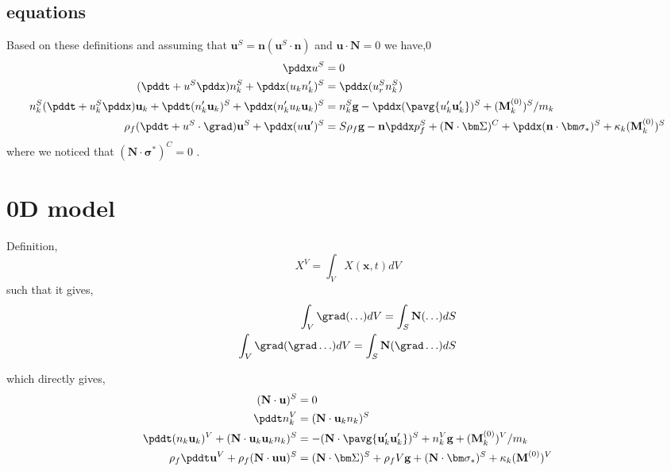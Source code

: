 \subsection{equations}
Based on these definitions and assuming that $\textbf{u}^S =\textbf{n}( \textbf{u}^S \cdot \textbf{n})$ and $\textbf{u}\cdot \textbf{N} = 0$ we have,0
\begin{align*}
    \pddx u^S &= 0\\
    (\pddt +  u^S \pddx) n_k^S 
    + \pddx (u_k n_k')^S
    &= 
    \pddx (u_r^S n_k^S)
    \\
    n_k^S (\pddt 
    + u_k^S \pddx)  \textbf{u}_k
    +\pddt (n_k' \textbf{u}_k)^S 
    + \pddx (n_k' u_k \textbf{u}_k )^S
    &= 
    n_k^S  \textbf{g}
    - \pddx (\pavg{ u_k'\textbf{u}_k'})^S
    +(\textbf{M}_k^{(0)})^S/m_k\\
    \rho_f (\pddt + u^S \cdot \grad)\textbf{u}^S
    + \pddx ( u \textbf{u}')^S
    &= 
    S \rho_f \textbf{g}
    - \textbf{n} \pddx p_f^S
    + (\textbf{N}\cdot  \bm\Sigma)^C 
    + \pddx (\textbf{n} \cdot \bm\sigma_*)^S
    +\kappa_k (\textbf{M}_k^{(0)})^S 
\end{align*}
where we noticed that $(\textbf{N}\cdot \bm\sigma^*)^C =0$ .


\section{0D model}
Definition,
\begin{equation}
    X^V = \int_V X(\textbf{x},t) dV
\end{equation}
such that it gives,
\begin{align}
    \int_V \grad (\ldots) dV
    = \int_S \textbf{N} (\ldots) dS\\
    \int_V \grad (\grad \ldots) dV
    = \int_S \textbf{N} (\grad \ldots) dS\\
\end{align}

which directly gives,
\begin{align*}
    (\textbf{N}\cdot \textbf{u})^S &= 0\\
    \pddt n_k^V &=  (\textbf{N}\cdot \textbf{u}_kn_k )^S\\
    \pddt  (n_k  \textbf{u}_k)^V + (\textbf{N}\cdot \textbf{u}_k \textbf{u}_k n_k)^S &= 
    - (\textbf{N}\cdot \pavg{\textbf{u}_k'\textbf{u}_k'})^S+ n_k^V \textbf{g}
    +(\textbf{M}_k^{(0)})^V/m_k\\
    \rho_f \pddt \textbf{u}^V + \rho_f (\textbf{N}\cdot \textbf{uu})^S
    &= 
    (\textbf{N}\cdot\bm\Sigma)^S
    + \rho_f V \textbf{g}
    + (\textbf{N}\cdot \bm\sigma_*)^S
    +\kappa_k  (\textbf{M}^{(0)})^V
\end{align*}


